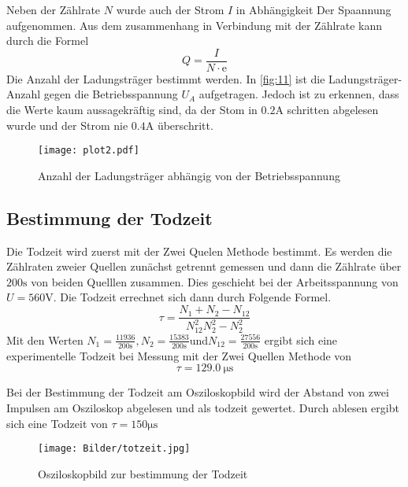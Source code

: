 Neben der Zählrate $N$ wurde auch der Strom $I$ in Abhängigkeit 
Der Spaannung aufgenommen. Aus dem zusammenhang in Verbindung 
mit der Zählrate kann durch die Formel 
\begin{equation}
    Q = \frac{I}{N \cdot \text{e}}
\end{equation}
Die Anzahl der Ladungsträger bestimmt werden. In \autoref{fig:11} ist die 
Ladungsträger-Anzahl gegen die Betriebsspannung $U_A$ aufgetragen. Jedoch ist 
zu erkennen, dass die Werte kaum aussagekräftig sind, da der Stom 
in $0.2 \unit{\ampere}$ schritten abgelesen wurde und der Strom 
nie $0.4 \unit{\ampere}$ überschritt.
\begin{figure}[H]
    \centering
    \caption{Anzahl der Ladungsträger abhängig von der Betriebsspannung}
    \label{fig:11}
    \texttt{[image: plot2.pdf]}
\end{figure}

\subsection{Bestimmung der Todzeit}
Die Todzeit wird zuerst mit der Zwei Quelen Methode bestimmt. Es 
werden die Zählraten zweier Quellen zunächst getrennt gemessen und 
dann die Zählrate über $200 \unit{\second}$ von beiden Quelllen zusammen. Dies geschieht bei der 
Arbeitsspannung von $U = 560 \unit{\volt}$. Die Todzeit errechnet sich dann 
durch Folgende Formel.
\begin{equation}
    \tau = \frac{N_\text{1} + N_\text{2} - N_\text{12}}{N_\text{12}^2  N_\text{2}^2 - N_\text{2}^2}
\end{equation}
Mit den Werten $N_\text{1} = \frac{11936}{200\unit{\second}} , N_\text{2} = \frac{15383}{200\unit{\second}} $und$ N_\text{12} = \frac{27556}{200\unit{\second}}$ ergibt sich eine 
experimentelle Todzeit bei Messung mit der Zwei Quellen Methode von 
\begin{equation}
    \tau = \qty{129.0}{\micro\second} 
\end{equation}

Bei der Bestimmung der Todzeit am Osziloskopbild wird der Abstand von zwei Impulsen am Osziloskop 
abgelesen und als todzeit gewertet. Durch ablesen ergibt sich eine Todzeit 
von $\tau = 150 \unit{\micro\second}$
\begin{figure}[H]
    \centering
    \caption{Osziloskopbild zur bestimmung der Todzeit}
    \label{fig:12}
    \texttt{[image: Bilder/totzeit.jpg]}
\end{figure} 

